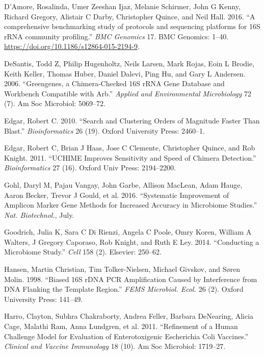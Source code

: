 \documentclass[smallextended]{svjour3}       %
\begin{document}
\leavevmode\hypertarget{ref-Amore2016}{}%
D'Amore, Rosalinda, Umer Zeeshan Ijaz, Melanie Schirmer, John G Kenny,
Richard Gregory, Alistair C Darby, Christopher Quince, and Neil Hall.
2016. ``A comprehensive benchmarking study of protocols and sequencing
platforms for 16S rRNA community profiling.'' \emph{BMC Genomics} 17.
BMC Genomics: 1--40. \url{https://doi.org/10.1186/s12864-015-2194-9}.

\leavevmode\hypertarget{ref-desantis2006greengenes}{}%
DeSantis, Todd Z, Philip Hugenholtz, Neils Larsen, Mark Rojas, Eoin L
Brodie, Keith Keller, Thomas Huber, Daniel Dalevi, Ping Hu, and Gary L
Andersen. 2006. ``Greengenes, a Chimera-Checked 16S rRNA Gene Database
and Workbench Compatible with Arb.'' \emph{Applied and Environmental
Microbiology} 72 (7). Am Soc Microbiol: 5069--72.

\leavevmode\hypertarget{ref-edgar2010search}{}%
Edgar, Robert C. 2010. ``Search and Clustering Orders of Magnitude
Faster Than Blast.'' \emph{Bioinformatics} 26 (19). Oxford University
Press: 2460--1.

\leavevmode\hypertarget{ref-edgar2011uchime}{}%
Edgar, Robert C, Brian J Haas, Jose C Clemente, Christopher Quince, and
Rob Knight. 2011. ``UCHIME Improves Sensitivity and Speed of Chimera
Detection.'' \emph{Bioinformatics} 27 (16). Oxford Univ Press:
2194--2200.

\leavevmode\hypertarget{ref-Gohl2016}{}%
Gohl, Daryl M, Pajau Vangay, John Garbe, Allison MacLean, Adam Hauge,
Aaron Becker, Trevor J Gould, et al. 2016. ``Systematic Improvement of
Amplicon Marker Gene Methods for Increased Accuracy in Microbiome
Studies.'' \emph{Nat. Biotechnol.}, July.

\leavevmode\hypertarget{ref-Goodrich2014}{}%
Goodrich, Julia K, Sara C Di Rienzi, Angela C Poole, Omry Koren, William
A Walters, J Gregory Caporaso, Rob Knight, and Ruth E Ley. 2014.
``Conducting a Microbiome Study.'' \emph{Cell} 158 (2). Elsevier:
250--62.

\leavevmode\hypertarget{ref-Hansen1998}{}%
Hansen, Martin Christian, Tim Tolker-Nielsen, Michael Givskov, and Søren
Molin. 1998. ``Biased 16S rDNA PCR Amplification Caused by Interference
from DNA Flanking the Template Region.'' \emph{FEMS Microbiol. Ecol.} 26
(2). Oxford University Press: 141--49.

\leavevmode\hypertarget{ref-harro2011refinement}{}%
Harro, Clayton, Subhra Chakraborty, Andrea Feller, Barbara DeNearing,
Alicia Cage, Malathi Ram, Anna Lundgren, et al. 2011. ``Refinement of a
Human Challenge Model for Evaluation of Enterotoxigenic Escherichia Coli
Vaccines.'' \emph{Clinical and Vaccine Immunology} 18 (10). Am Soc
Microbiol: 1719--27.
\end{document}
